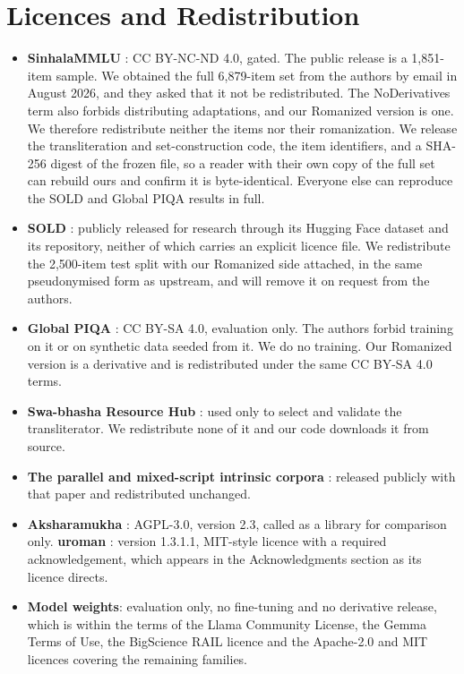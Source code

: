 \documentclass[11pt]{article}
\begin{document}
\section{Licences and Redistribution}
\label{sec:licences}

\begin{itemize}\itemsep2pt
\item \textbf{SinhalaMMLU} \citep{pramodya-etal-2025-sinhalammlu}: CC BY-NC-ND
4.0, gated. The public release is a 1{,}851-item sample. We obtained the full
6{,}879-item set from the authors by email in August 2026, and they asked that it
not be redistributed. The NoDerivatives term also forbids distributing
adaptations, and our Romanized version is one. We therefore redistribute neither
the items nor their romanization. We release the transliteration and
set-construction code, the item identifiers, and a SHA-256 digest of the frozen
file, so a reader with their own copy of the full set can rebuild ours and confirm
it is byte-identical. Everyone else can reproduce the SOLD and Global PIQA results
in full.
\item \textbf{SOLD} \citep{ranasinghe-etal-2025-sold}: publicly released for
research through its Hugging Face dataset and its repository, neither of which
carries an explicit licence file. We redistribute the 2{,}500-item test split with
our Romanized side attached, in the same pseudonymised form as upstream, and will
remove it on request from the authors.
\item \textbf{Global PIQA} \citep{chang-etal-2025-globalpiqa,
desilva-ranathunga-2026-sinhalapiqa}: CC BY-SA 4.0, evaluation only. The authors
forbid training on it or on synthetic data seeded from it. We do no training. Our
Romanized version is a derivative and is redistributed under the same CC BY-SA 4.0
terms.
\item \textbf{Swa-bhasha Resource Hub}
\citep{sumanathilaka-etal-2025-swabhasha}: used only to select and validate the
transliterator. We redistribute none of it and our code downloads it from source.
\item \textbf{The parallel and mixed-script intrinsic corpora}
\citep{rajapakse-weerasinghe-2026-script}: released publicly with that paper and
redistributed unchanged.
\item \textbf{Aksharamukha} \citep{rajan-aksharamukha}: AGPL-3.0, version 2.3,
called as a library for comparison only. \textbf{uroman}
\citep{hermjakob-etal-2018-uroman}: version 1.3.1.1, MIT-style licence with a
required acknowledgement, which appears in the Acknowledgments section as its
licence directs.
\item \textbf{Model weights}: evaluation only, no fine-tuning and no derivative
release, which is within the terms of the Llama Community License, the Gemma Terms
of Use, the BigScience RAIL licence and the Apache-2.0 and MIT licences covering
the remaining families.
\end{itemize}
\end{document}
